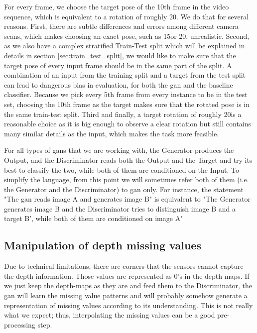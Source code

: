 For every frame, we choose the target pose of the 10th frame in the video sequence, which
is equivalent to a rotation of roughly 20\degree. We do that for several reasons. First,
there are subtle differences and errors among different camera scans, which makes choosing
an exact pose, such as 15\degree or 20\degree, unrealistic. Second, as we also have a
complex stratified Train-Test split which will be explained in details in section
\ref{sec:train_test_split}, we would like to make sure that the target pose of every input
frame should be in the same part of the split. A combination of an input from the training
split and a target from the test split can lead to dangerous bias in evaluation, for both
the \acrshort{gan} and the baseline classifier. Because we pick every 5th frame from every
instance to be in the test set, choosing the 10th frame as the target makes sure that the
rotated pose is in the same train-test split. Third and finally, a target rotation of
roughly 20\degree is a reasonable choice as it is big enough to observe a clear rotation
but still contains many similar details as the input, which makes the task more feasible.

For all types of \acrshort{gan}s that we are working with, the Generator produces the
Output, and the Discriminator reads both the Output and the Target and try its best to
classify the two, while both of them are conditioned on the Input. To simplify the
language, from this point we will sometimes refer both of them (i.e. the Generator and the
Discriminator) to \acrshort{gan} only. For instance, the statement "The \acrshort{gan} reads
image A and generates image B" is equivalent to "The Generator generates image B and the
Discriminator tries to distinguish image B and a target B', while both of them are
conditioned on image A"

\subsection{Manipulation of depth missing values }
Due to technical limitations, there are corners that the sensors cannot capture the depth
information. Those values are represented as 0's in the depth-maps. If we just keep the
depth-maps as they are and feed them to the Discriminator, the \acrshort{gan} will learn
the missing value patterns and will probably somehow generate a representation of missing
values according to its understanding. This is not really what we expect; thus,
interpolating the missing values can be a good pre-processing step.

